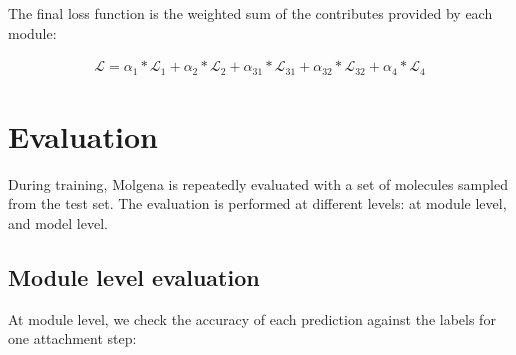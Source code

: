 \documentclass{article}
\begin{document}
The final loss function is the weighted sum of the contributes provided by each module:

\begin{equation}
\begin{gathered}
\mathcal{L} = \alpha_1 * \mathcal{L}_1 +
    \alpha_2 * \mathcal{L}_2 +
    \alpha_{31} * \mathcal{L}_{31} +
    \alpha_{32} * \mathcal{L}_{32} +
    \alpha_4 * \mathcal{L}_4
\end{gathered}
\end{equation}


\section{Evaluation}

During training, Molgena is repeatedly evaluated with a set of molecules sampled from the test set.
The evaluation is performed at different levels: at module level, and model level.

\subsection{Module level evaluation}

At module level, we check the accuracy of each prediction against the labels for one attachment step:
\end{document}
